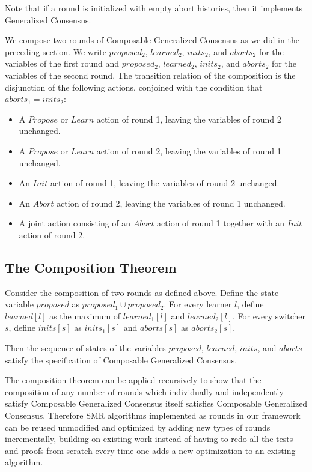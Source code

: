 Note that if a round is initialized with empty abort histories, then it implements Generalized Consensus.

We compose two rounds of Composable Generalized Consensus as we did in the preceding section.
We write $proposed_2$, $learned_2$, $inits_2$, and $aborts_2$ for the variables of the first round and  $proposed_2$, $learned_2$, $inits_2$, and $aborts_2$
for the variables of the second round.
The transition relation of the composition is the disjunction of the following actions, conjoined with the condition that $aborts_1=inits_2$:
\begin{itemize}
  \item A $Propose$ or $Learn$ action of round 1, leaving the variables of round 2 unchanged.
  \item A $Propose$ or $Learn$ action of round 2, leaving the variables of round 1 unchanged.
  \item An $Init$ action of round 1, leaving the variables of round 2 unchanged.
  \item An $Abort$ action of round 2, leaving the variables of round 1 unchanged.
  \item A joint action consisting of an $Abort$ action of round 1 together with an $Init$ action of round 2.
\end{itemize}

\subsection{The Composition Theorem}

\begin{thm}
    \label{thm:comp}
Consider the composition of two rounds as defined above.
Define the state variable $proposed$ as $proposed_1 \cup proposed_2$. For every learner $l$, define 
$learned\left[ l \right]$ as the maximum of $learned_1\left[ l \right]$ and $learned_2\left[ l \right]$.
For every switcher $s$, define $inits\left[ s \right]$ as $inits_1\left[ s \right]$ and $aborts\left[ s \right]$ as $aborts_2\left[ s \right]$.

Then the sequence of states of the variables $proposed$, $learned$, $inits$, and $aborts$ satisfy the specification of Composable Generalized Consensus.
\end{thm}

The composition theorem can be applied recursively to show that the composition of any number of rounds which individually and independently satisfy Composable Generalized Consensus itself satisfies Composable Generalized Consensus. 
Therefore SMR algorithms implemented as rounds in our framework can be reused unmodified and optimized by adding new types of rounds incrementally, building on existing work instead of having to redo all the tests and proofs from scratch every time one adds a new optimization to an existing algorithm.

